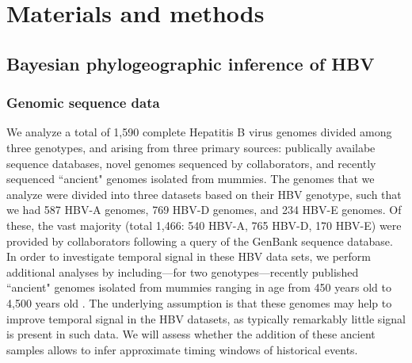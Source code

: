 \chapter{Materials and methods}
\label{ch:methodology}

%

\section{Bayesian phylogeographic inference of HBV}

\subsection{Genomic sequence data}
We analyze a total of 1,590 complete Hepatitis B virus genomes divided among three genotypes, and arising from three primary sources: publically availabe sequence databases, novel genomes sequenced by collaborators, and recently sequenced ``ancient" genomes isolated from mummies.
The genomes that we analyze were divided into three datasets based on their HBV genotype, such that we had 587 HBV-A genomes, 769 HBV-D genomes, and 234 HBV-E genomes.
Of these, the vast majority (total 1,466: 540 HBV-A, 765 HBV-D, 170 HBV-E) were provided by collaborators following a query of the GenBank sequence database. %
In order to investigate temporal signal in these HBV data sets, we perform additional analyses by including---for two genotypes---recently published ``ancient" genomes isolated from mummies ranging in age from 450 years old to 4,500 years old \cite{muhlemann, ross}. %
The underlying assumption is that these genomes may help to improve temporal signal in the HBV datasets, as typically remarkably little signal is present in such data.
We will assess whether the addition of these ancient samples allows to infer approximate timing windows of historical events.

